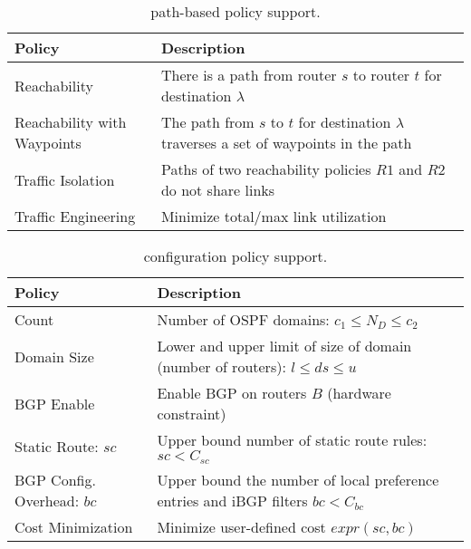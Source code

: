 \begin{table}
\begin{small}
	\begin{center}
		\begin{tabular}{m{7.8em}  m{15.9em} } 
			{\bf Policy} & {\bf Description} \\ 
			\hline
			Reachability & There is a path from router $s$ to router $t$ for destination $\lambda$ \\ \hline
			Reachability with \newline Waypoints & The path  from $s$ to $t$ for destination $\lambda$ 
			traverses a set of waypoints in the path\\ \hline
			Traffic Isolation & Paths of two reachability policies $R1$ and $R2$ do not share  links \\ \hline
			Traffic Engineering  & Minimize total/max link utilization \\
		\end{tabular}
	\end{center}
	\caption{\genesis path-based policy support.} \label{tab:policysupport} 
\end{small}
\end{table}
\begin{table}[!t]
	\begin{small}
		\begin{center}
			\begin{tabular}{m{6.5em}  m{17.7em} } 
				{\bf Policy} & {\bf Description} \\ 
				\hline
				Count  & Number of OSPF domains: $c_1\leq N_D\leq c_2$  \\ \hline
				Domain Size  & Lower and upper
				limit of size of domain (number of routers): $l\leq ds\leq u$ \\ \hline
				BGP \newline Enable & Enable BGP on routers $B$ (hardware constraint) \\ \hline
				Static Route: ${sc}$ & Upper bound number of static route rules: $sc < C_{sc}$ \\ \hline
				BGP Config. Overhead: $bc$ & Upper bound the number of local preference entries and iBGP filters $bc < C_{bc}$ \\ \hline
				Cost Minimization & Minimize user-defined cost $expr(sc, bc)$
			\end{tabular}
		\end{center}
		\caption{\name configuration policy support.} \label{tab:configpolicysupport} 
	\end{small}
\end{table}